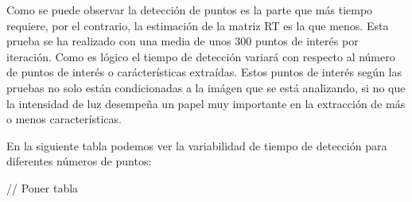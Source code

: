 Como se puede observar la detección de puntos es la parte que más tiempo requiere, por el contrario, la estimación de la matriz RT es la que menos. Esta prueba se ha realizado con una media de unos 300 puntos de interés por iteración. Como es lógico el tiempo de detección variará con respecto al número de puntos de interés o carácterísticas extraídas. Estos puntos de interés según las pruebas no solo están condicionadas a la imágen que se está analizando, si no que la intensidad de luz desempeña un papel muy importante en la extracción de más o menos características.

En la siguiente tabla podemos ver la variabilidad de tiempo de detección para diferentes números de puntos:

// Poner tabla
